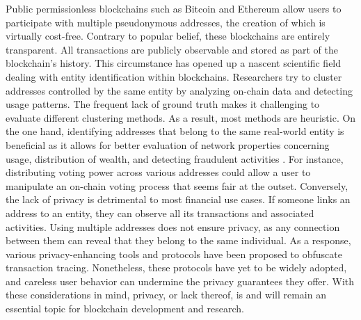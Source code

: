 \documentclass[12pt,a4paper,titlepage,oneside,english]{article}
\begin{document}
Public permissionless blockchains such as Bitcoin \citep{nakamotoBitcoin2008} and Ethereum \citep{buterin2014ethereum} allow users to participate with multiple pseudonymous addresses, the creation of which is virtually cost-free. Contrary to popular belief, these blockchains are entirely transparent. All transactions are publicly observable and stored as part of the blockchain's history.
This circumstance has opened up a nascent scientific field dealing with entity identification within blockchains. Researchers try to cluster addresses controlled by the same entity by analyzing on-chain data and detecting usage patterns. The frequent lack of ground truth makes it challenging to evaluate different clustering methods. As a result, most methods are heuristic. \newline
On the one hand, identifying addresses that belong to the same real-world entity is beneficial as it allows for better evaluation of network properties concerning usage, distribution of wealth, and detecting fraudulent activities \citep{FV:17}. For instance, distributing voting power across various addresses could allow a user to manipulate an on-chain voting process that seems fair at the outset. \newline
Conversely, the lack of privacy is detrimental to most financial use cases. If someone links an address to an entity, they can observe all its transactions and associated activities. Using multiple addresses does not ensure privacy, as any connection between them can reveal that they belong to the same individual. \citep{Beres2020, nadler2023tornado} \newline
As a response, various privacy-enhancing tools and protocols have been proposed to obfuscate transaction tracing. 
Nonetheless, these protocols have yet to be widely adopted, and careless user behavior can undermine the privacy guarantees they offer. \newline
With these considerations in mind, privacy, or lack thereof, is and will remain an essential topic for blockchain development and research. %
\end{document}
